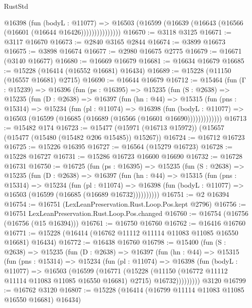 \begin{lexlean}{RustStd}
\begin{coremodule}
                  @16398
                    (fun (bodyL : @11077) =>
                    @16503 (@16599 (@16639 (@16643 (@16566 (@16601 (@16644 @16426)))))))))))))))
@16670 := @3118 @3125
@16671 := @3117 @16670
@16673 := @2840 @3165 @2844
@16674 := @3899 @16673
@16675 := @3898 @16674
@16677 := @2980 @16675 @2775
@16679 := @16671 (@3140 @16677)
@16680 := @16669 @16679
@16681 := @16634 @16679
@16685 := @15228 (@16414 (@16552 @16681) @16434)
@16689 := @15228 (@11150 (@16557 @16681) @2715)
@16690 := @16644 @16679
@16712 := @15464
    (fun (Γ : @15239) =>
    @16396
      (fun (ps : @16395) =>
      @15235
        (fun (S : @2638) =>
        @15235
          (fun (D : @2638) =>
          @16397
            (fun (hn : @44) =>
            @15315
              (fun (pns : @15314) =>
              @15234
                (fun (pl : @11074) =>
                @16398
                  (fun (bodyL : @11077) =>
                  @16503 (@16599 (@16685 (@16689 (@16566 (@16601 @16690)))))))))))))
@16713 := @15482 @174
@16723 := @15477 (@15971 (@16713 @15972)) (@15657 (@15477 (@15480 (@15482 @206 @15485)) @15267))
@16724 := @16712 @16723
@16725 := @15226 @16395
@16727 := @16564 (@15279 @16723)
@16728 := @15228 @16727
@16731 := @15286 @16723 @16600 @16690
@16732 := @16728 @16731
@16750 := @16725
    (fun (ps : @16395) =>
    @15235
      (fun (S : @2638) =>
      @15235
        (fun (D : @2638) =>
        @16397
          (fun (hn : @44) =>
          @15315
            (fun (pns : @15314) =>
            @15234
              (fun (pl : @11074) =>
              @16398 (fun (bodyL : @11077) => @16503 (@16599 (@16685 (@16689 @16732))))))))))
@16751 := @2 @16394
@16754 := @16751 (LexLeanPreservation.Rust.Loop.Pos.kept @2796)
@16756 := @16751 LexLeanPreservation.Rust.Loop.Pos.changed
@16760 := @16754 (@16756 (@16756 (@15 @16394)))
@16761 := @16750 @16760
@16762 := @16416 @16760
@16771 := @15228 (@16414 (@16762 @11112 @11114 @11083 @11085 @16550 @16681) @16434)
@16772 := @16438 @16760
@16798 := @15400
    (fun (S : @2638) =>
    @15235
      (fun (D : @2638) =>
      @16397
        (fun (hn : @44) =>
        @15315
          (fun (pns : @15314) =>
          @15234
            (fun (pl : @11074) =>
            @16398
              (fun (bodyL : @11077) =>
              @16503
                (@16599
                  (@16771
                    (@15228
                      (@11150 (@16772 @11112 @11114 @11083 @11085 @16550 @16681) @2715)
                      @16732)))))))))
    @3120
@16799 := @16762 @3120
@16807 := @15228 (@16414 (@16799 @11114 @11083 @11085 @16550 @16681) @16434)

\end{coremodule}
\end{lexlean}
